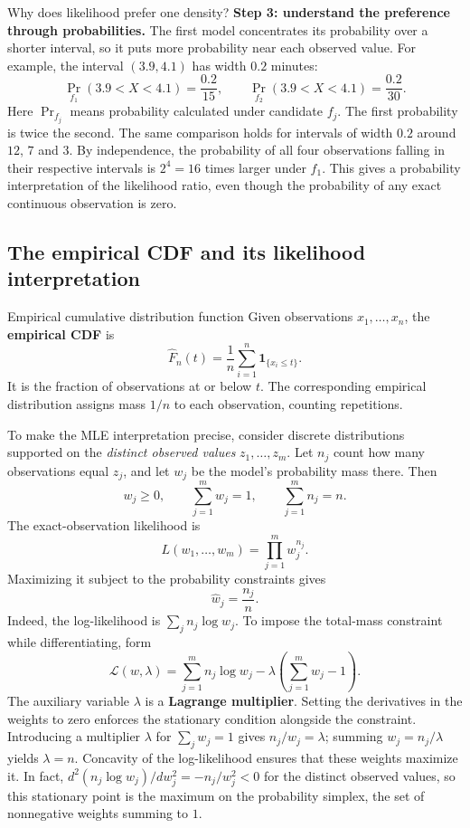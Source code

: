 \documentclass[a4paper,12pt,oneside]{report}
\begin{document}
\begin{framedexample}{Why does likelihood prefer one density?}
\textbf{Step 3: understand the preference through probabilities.}
The first model concentrates its probability over a shorter
interval, so it puts more probability near each observed value.
For example, the interval $(3.9,4.1)$ has width $0.2$ minutes:
\[
  \Pr_{f_1}(3.9<X<4.1)=\frac{0.2}{15},
  \qquad
  \Pr_{f_2}(3.9<X<4.1)=\frac{0.2}{30}.
\]
Here $\Pr_{f_j}$ means probability calculated under candidate
$f_j$. The first probability is twice the second. The same
comparison holds for intervals of width $0.2$ around $12$, $7$
and $3$. By independence, the probability of all four observations
falling in their respective intervals is $2^4=16$ times larger
under $f_1$. This gives a probability interpretation of the
likelihood ratio, even though the probability of any exact
continuous observation is zero.
\end{framedexample}

\clearpage
\subsection{The empirical CDF and its likelihood interpretation}

\begin{frameddefn}{Empirical cumulative distribution function}
Given observations $x_1,\ldots,x_n$, the \textbf{empirical CDF}
is
\[
  \widehat F_n(t)=\frac1n\sum_{i=1}^n
    \mathbf 1_{\{x_i\leq t\}}.
\]
It is the fraction of observations at or below $t$.
The corresponding empirical distribution assigns mass $1/n$
to each observation, counting repetitions.
\end{frameddefn}

To make the MLE interpretation precise, consider discrete
distributions supported on the \emph{distinct observed values}
$z_1,\ldots,z_m$. Let $n_j$ count how many observations equal
$z_j$, and let $w_j$ be the model's probability mass there.
Then
\[
  w_j\geq0,\qquad \sum_{j=1}^m w_j=1,
  \qquad \sum_{j=1}^m n_j=n.
\]
The exact-observation likelihood is
\[
  L(w_1,\ldots,w_m)=\prod_{j=1}^m w_j^{n_j}.
\]
Maximizing it subject to the probability constraints gives
\[
  \widehat w_j=\frac{n_j}{n}.
\]
Indeed, the log-likelihood is $\sum_j n_j\log w_j$.
To impose the total-mass constraint while differentiating, form
\[
  \mathcal L(w,\lambda)=\sum_{j=1}^m n_j\log w_j
                  -\lambda\left(\sum_{j=1}^m w_j-1\right).
\]
The auxiliary variable $\lambda$ is a \textbf{Lagrange multiplier}.
Setting the derivatives in the weights to zero enforces the
stationary condition alongside the constraint.
Introducing a multiplier $\lambda$ for $\sum_jw_j=1$ gives
$n_j/w_j=\lambda$; summing $w_j=n_j/\lambda$ yields $\lambda=n$.
Concavity of the log-likelihood ensures that these weights
maximize it.
In fact, $d^2(n_j\log w_j)/dw_j^2=-n_j/w_j^2<0$ for the distinct
observed values, so this stationary point is the maximum on the
probability simplex, the set of nonnegative weights summing to $1$.
\end{document}
